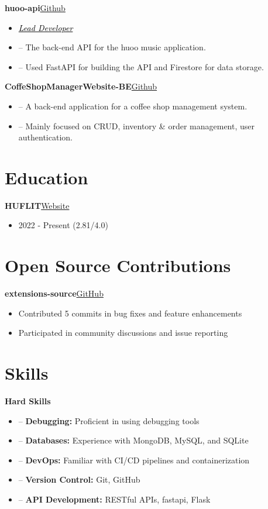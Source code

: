 \documentclass[a4paper,12pt]{article}
\newenvironment{itemList}[3][]
    {
    \noindent\hspace{1em}\textbf{#2}\hfill#3\\[3.75pt]
    \begin{minipage}[t]{\linewidth}
    \begin{itemize}[nosep,after=\strut, leftmargin=2em, itemsep=3pt,label={},#1]
    }
    {
    \end{itemize}
    \end{minipage}
    }
\newcommand{\listSubHeading}[1]{
    \item[] \noindent\hspace{-1em}\textit{#1}
    }
\begin{document}
\begin{itemList}{huoo-api}{\href{https://github.com/foxeiz/huoo-api}{Github}}
    \listSubHeading{\href{https://github.com/FoxeiZ/huoo-api/graphs/contributors}{\textcolor{black}{Lead Developer}}}
    \item -- The back-end API for the huoo music application.
    \item -- Used FastAPI for building the API and Firestore for data storage.
\end{itemList}

\begin{itemList}{CoffeShopManagerWebsite-BE}{\href{https://github.com/foxeiz/CoffeShopManagerWebsite-BE/}{Github}}
    \item -- A back-end application for a coffee shop management system.
    \item -- Mainly focused on CRUD, inventory \& order management, user authentication.
\end{itemList}


\section{Education}
\begin{itemList}{HUFLIT}{\href{https://huflit.edu.vn/}{Website}}
    \item 2022 - Present \hfill  (2.81/4.0)\\
\end{itemList}

\section{Open Source Contributions}
\begin{itemList}{extensions-source}{\href{https://github.com/keiyoushi/extensions-source}{GitHub}}
    \item Contributed 5 commits in bug fixes and feature enhancements
    \item Participated in community discussions and issue reporting
\end{itemList}

\newpage
\section{Skills}
\begin{itemList}[itemsep=5pt]{Hard Skills}{}
    \item -- \textbf{Debugging:} Proficient in using debugging tools
    \item -- \textbf{Databases:} Experience with MongoDB, MySQL, and SQLite
    \item -- \textbf{DevOps:} Familiar with CI/CD pipelines and containerization
    \item -- \textbf{Version Control:} Git, GitHub
    \item -- \textbf{API Development:} RESTful APIs, fastapi, Flask
\end{itemList}
\end{document}
